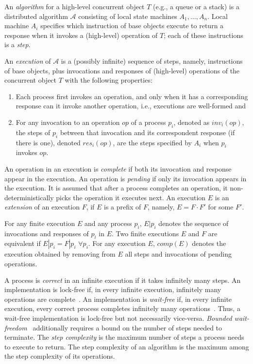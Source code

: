 An \emph{algorithm} for a high-level concurrent object \(T\) (e.g., a queue or a stack) is a distributed algorithm \(\mathcal{A}\) consisting of local state machines \(A_1,\ldots, A_n\). Local machine \(A_i\) specifies which instruction of base objects execute to return a response when it invokes a (high-level) operation of \(T\); each of these instructions is a \emph{step}.

An \emph{execution} of \(\mathcal{A}\) is a (possibly infinite) sequence of steps, namely, instructions of base objects, plus invocations and responses of (high-level) operations of the concurrent object \(T\) with the following properties:

\begin{enumerate}
    \item Each process first invokes an operation, and only when it has a corresponding response can it invoke another operation, i.e., executions are well-formed and
    \item For any invocation to an operation \(op\) of a process \(p_i\), denoted as \(inv_i(op)\), the steps of \(p_i\) between that invocation and its correspondent response (if there is one), denoted \(res_i(op)\), are the steps specified by \(A_i\) when \(p_i\) invokes \(op\).
\end{enumerate}

An operation in an execution is \emph{complete} if both its invocation and response appear in the execution. An operation is \emph{pending} if only its invocation appears in the execution. It is assumed that after a process completes an operation, it non-deterministically picks the operation it executes next. An execution \(E\) is an \emph{extension} of an execution \(F\), if \(E\) is a prefix of \(F\), namely, \(E = F\cdot F'\) for some \(F'\).

For any finite execution \(E\) and any process \(p_i\), \(E|p_i\) denotes the sequence of invocations and responses of \(p_i\) in \(E\). Two finite executions \(E\) and \(F\) are equivalent if \(E|p_i = F|p_i\) \(\forall p_i\). For any execution \(E\), \(comp(E)\) denotes the execution obtained by removing from \(E\) all steps and invocations of pending operations.

A process is \emph{correct} in an infinite execution if it takes infinitely many steps. An implementation is lock-free if, in every infinite execution, infinitely many operations are complete~\cite{DBLP_journals_toplas_HerlihyW90}. An implementation is \emph{wait-free} if, in every infinite execution, every correct process completes infinitely many operations~\cite {DBLP_journals_toplas_Herlihy91}. Thus, a wait-free implementation is lock-free but not necessarily vice-versa. \emph{Bounded wait-freedom}~\cite{DBLP_conf_spaa_Herlihy91} additionally requires a bound on the number of steps needed to terminate. The \emph{step complexity} is the maximum number of steps a process needs to execute to return. The step complexity of an algorithm is the maximum among the step complexity of its operations.

